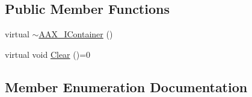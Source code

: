 \subsection*{Public Member Functions}
\begin{DoxyCompactItemize}
\item 
virtual \hyperlink{a00089_ac8974c4fdc9352dc662bf7242b83c7c9}{$\sim$\+A\+A\+X\+\_\+\+I\+Container} ()
\item 
virtual void \hyperlink{a00089_a35280907fac53883d3501beef8c30596}{Clear} ()=0
\end{DoxyCompactItemize}


\subsection{Member Enumeration Documentation}
\hypertarget{a00089_aea020100f0b06636ce7cb25c2fdb0af7}{}

